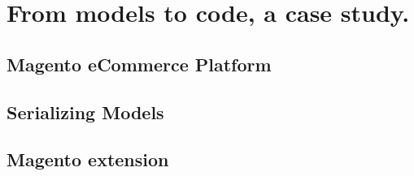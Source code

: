 \chead{}
\chapter{From models to code, a case study.}

\section{Magento eCommerce Platform}

\section{Serializing Models}

\section{Magento extension}


